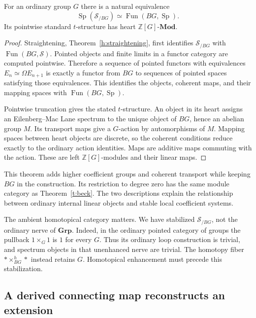 \begin{theorem}\label{t:spectra-over-bg}
For an ordinary group $G$ there is a natural equivalence
\[
 \operatorname{Sp}(\mathcal S_{/BG})
  \simeq\operatorname{Fun}(BG,\operatorname{Sp}).
\]
Its pointwise standard $t$-structure has heart
$\mathbb Z[G]\text{-}\mathbf{Mod}$.
\end{theorem}
\begin{proof}
Straightening, Theorem~\ref{h:straightening}, first identifies
$\mathcal S_{/BG}$ with $\operatorname{Fun}(BG,\mathcal S)$.
Pointed objects and finite limits in a functor category are computed
pointwise.  Therefore a sequence of pointed functors with equivalences
$E_n\simeq\Omega E_{n+1}$ is exactly a functor from $BG$ to sequences
of pointed spaces satisfying those equivalences.  This identifies the
objects, coherent maps, and their mapping spaces with
$\operatorname{Fun}(BG,\operatorname{Sp})$.

Pointwise truncation gives the stated $t$-structure.  An object in its
heart assigns an Eilenberg--Mac Lane spectrum to the unique object of
$BG$, hence an abelian group $M$.  Its transport maps give a $G$-action
by automorphisms of $M$.  Mapping spaces between heart objects are
discrete, so the coherent conditions reduce exactly to the ordinary
action identities.  Maps are additive maps commuting with the action.
These are left $\mathbb Z[G]$-modules and their linear maps.
\end{proof}

This theorem adds higher coefficient groups and coherent transport while
keeping $BG$ in the construction.  Its restriction to degree zero has
the same module category as Theorem~\ref{t:beck}.  The two descriptions
explain the relationship between ordinary internal linear objects and
stable local coefficient systems.

The ambient homotopical category matters.  We have stabilized
$\mathcal S_{/BG}$, not the ordinary nerve of $\mathbf{Grp}$.
Indeed, in the ordinary pointed category of groups the pullback
$1\times_G1$ is $1$ for every $G$.  Thus its ordinary loop construction
is trivial, and spectrum objects in that unenhanced nerve are trivial.
The homotopy fiber $*\times^h_{BG}*$ instead retains $G$.
Homotopical enhancement must precede this stabilization.

\subsection{A derived connecting map reconstructs an extension}

